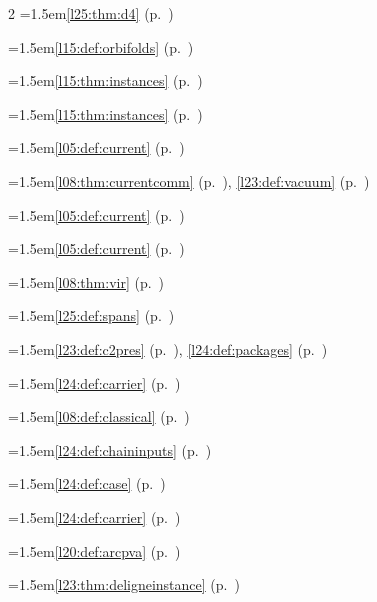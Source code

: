 \begin{multicols}{2}
\hangindent=1.5em\quad \ref{l25:thm:d4} (p.~\pageref{l25:thm:d4})\par
\hangindent=1.5em\quad \ref{l15:def:orbifolds} (p.~\pageref{l15:def:orbifolds})\par
\hangindent=1.5em\quad \ref{l15:thm:instances} (p.~\pageref{l15:thm:instances})\par
\hangindent=1.5em\quad \ref{l15:thm:instances} (p.~\pageref{l15:thm:instances})\par
\hangindent=1.5em\quad \ref{l05:def:current} (p.~\pageref{l05:def:current})\par
\hangindent=1.5em\quad \ref{l08:thm:currentcomm} (p.~\pageref{l08:thm:currentcomm}), \ref{l23:def:vacuum} (p.~\pageref{l23:def:vacuum})\par
\hangindent=1.5em\quad \ref{l05:def:current} (p.~\pageref{l05:def:current})\par
\hangindent=1.5em\quad \ref{l05:def:current} (p.~\pageref{l05:def:current})\par
\hangindent=1.5em\quad \ref{l08:thm:vir} (p.~\pageref{l08:thm:vir})\par
\hangindent=1.5em\quad \ref{l25:def:spans} (p.~\pageref{l25:def:spans})\par
\hangindent=1.5em\quad \ref{l23:def:c2pres} (p.~\pageref{l23:def:c2pres}), \ref{l24:def:packages} (p.~\pageref{l24:def:packages})\par
\hangindent=1.5em\quad \ref{l24:def:carrier} (p.~\pageref{l24:def:carrier})\par
\hangindent=1.5em\quad \ref{l08:def:classical} (p.~\pageref{l08:def:classical})\par
\hangindent=1.5em\quad \ref{l24:def:chaininputs} (p.~\pageref{l24:def:chaininputs})\par
\hangindent=1.5em\quad \ref{l24:def:case} (p.~\pageref{l24:def:case})\par
\hangindent=1.5em\quad \ref{l24:def:carrier} (p.~\pageref{l24:def:carrier})\par
\hangindent=1.5em\quad \ref{l20:def:arcpva} (p.~\pageref{l20:def:arcpva})\par
\hangindent=1.5em\quad \ref{l23:thm:deligneinstance} (p.~\pageref{l23:thm:deligneinstance})\par

\end{multicols}
